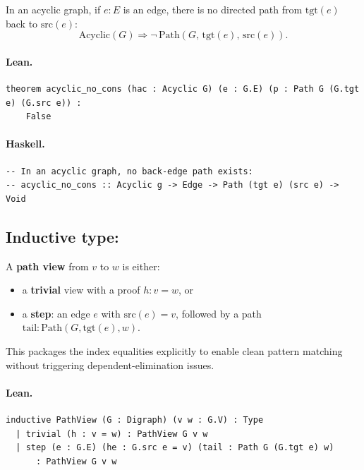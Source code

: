 \documentclass[11pt,a4paper]{article}
\begin{document}
\begin{prop}
In an acyclic graph, if $e : E$ is an edge, there is no directed path from
$\mathrm{tgt}(e)$ back to $\mathrm{src}(e)$:
\[
  \mathrm{Acyclic}(G) \Rightarrow \neg\,\mathrm{Path}(G,\, \mathrm{tgt}(e),\, \mathrm{src}(e)).
\]
\end{prop}

\paragraph{Lean.}
\begin{lstlisting}[style=lean]
theorem acyclic_no_cons (hac : Acyclic G) (e : G.E) (p : Path G (G.tgt e) (G.src e)) :
    False
\end{lstlisting}

\paragraph{Haskell.}
\begin{lstlisting}[style=haskell]
-- In an acyclic graph, no back-edge path exists:
-- acyclic_no_cons :: Acyclic g -> Edge -> Path (tgt e) (src e) -> Void
\end{lstlisting}


\subsection{Inductive type: }

\begin{defn}
A \textbf{path view} from $v$ to $w$ is either:
\begin{itemize}
  \item a \textbf{trivial} view with a proof $h : v = w$, or
  \item a \textbf{step}: an edge $e$ with $\mathrm{src}(e) = v$, followed by a
        path $\mathrm{tail} : \mathrm{Path}(G, \mathrm{tgt}(e), w)$.
\end{itemize}
This packages the index equalities explicitly to enable clean pattern matching
without triggering dependent-elimination issues.
\end{defn}

\paragraph{Lean.}
\begin{lstlisting}[style=lean]
inductive PathView (G : Digraph) (v w : G.V) : Type
  | trivial (h : v = w) : PathView G v w
  | step (e : G.E) (he : G.src e = v) (tail : Path G (G.tgt e) w)
      : PathView G v w
\end{lstlisting}
\end{document}

